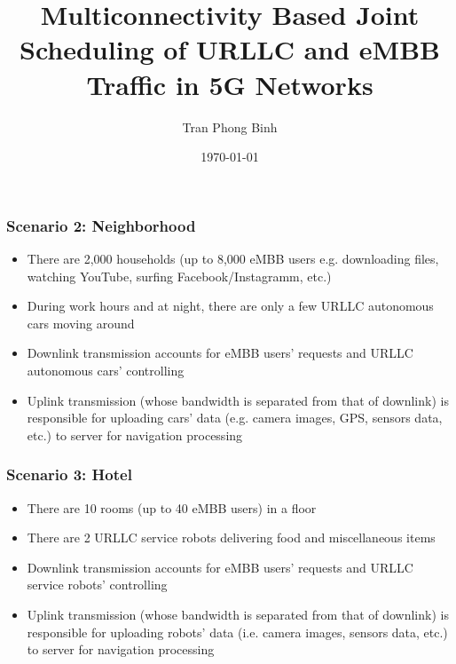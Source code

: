\documentclass{beamer}
\title{Multiconnectivity Based Joint Scheduling of URLLC and eMBB Traffic in 5G Networks}
\author{Tran Phong Binh}
\institute{Department of Computer Science, National Tsing Hua University}
\date{\today}
\begin{document}
\begin{frame}
  \titlepage
\end{frame}

\begin{frame}
  \frametitle{Scenario 2: Neighborhood}
  \begin{itemize}
    \item There are 2,000 households (up to 8,000 eMBB users e.g. downloading files, watching YouTube, surfing Facebook/Instagramm, etc.)
    \item During work hours and at night, there are only a few URLLC autonomous cars moving around
    \item Downlink transmission accounts for eMBB users' requests and URLLC autonomous cars' controlling
    \item Uplink transmission (whose bandwidth is separated from that of downlink) is responsible for uploading cars' data (e.g. camera images, GPS, sensors data, etc.) to server for navigation processing
  \end{itemize}
\end{frame}

\begin{frame}
  \frametitle{Scenario 3: Hotel}
  \begin{itemize}
    \item There are 10 rooms (up to 40 eMBB users) in a floor
    \item There are 2 URLLC service robots delivering food and miscellaneous items
    \item Downlink transmission accounts for eMBB users' requests and URLLC service robots' controlling
    \item Uplink transmission (whose bandwidth is separated from that of downlink) is responsible for uploading robots' data (i.e. camera images, sensors data, etc.) to server for navigation processing
  \end{itemize}
\end{frame}
\end{document}
